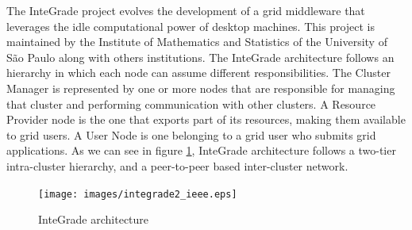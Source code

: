 \documentclass[times, 09pt, twocolumn]{article}
\begin{document}
The InteGrade project evolves the development of a grid middleware that
leverages the idle computational power of desktop machines. This project is
maintained by the Institute of Mathematics and Statistics of the University of
S\~{a}o Paulo along with others institutions. 
The InteGrade architecture follows an hierarchy in which each node can assume
different responsibilities. The Cluster Manager is represented by one or more
nodes that are responsible for managing that cluster and performing
communication with other clusters. A Resource Provider node is the one that
exports part of its resources, making them available to grid users. A User Node
is one belonging to a grid user who submits grid applications. As we can see in
figure \ref{fig:integrade}, InteGrade architecture follows a two-tier
intra-cluster hierarchy, and a peer-to-peer based inter-cluster network.

\begin{figure}[th]
\centering \texttt{[image: images/integrade2\_ieee.eps]}
\caption{InteGrade architecture}
\label{fig:integrade}
\end{figure}
\end{document}
